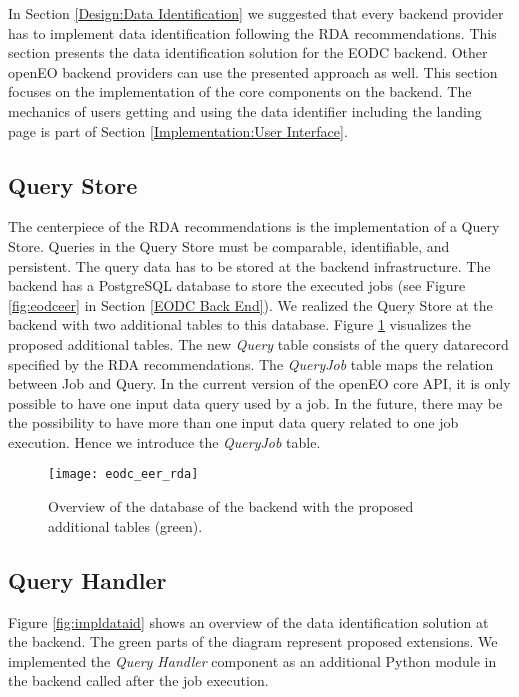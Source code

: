 \documentclass[draft,final]{vutinfth} %
\begin{document}
In Section \ref{Design:Data Identification} we suggested that every backend provider has to implement data identification following the RDA recommendations. This section presents the data identification solution for the EODC backend. Other openEO backend providers can use the presented approach as well. This section focuses on the implementation of the core components on the backend. The mechanics of users getting and using the data identifier including the landing page is part of Section \ref{Implementation:User Interface}. \\

\subsection{Query Store}
The centerpiece of the RDA recommendations is the implementation of a Query Store. Queries in the Query Store must be comparable, identifiable, and persistent. The query data has to be stored at the backend infrastructure. The backend has a PostgreSQL database to store the executed jobs (see Figure \ref{fig:eodceer} in Section \ref{EODC Back End}). We realized the Query Store at the backend with two additional tables to this database. Figure \ref{fig:eer_rda} visualizes the proposed additional tables. The new \textit{Query} table consists of the query datarecord specified by the RDA recommendations. The \textit{QueryJob} table maps the relation between Job and Query. In the current version of the openEO core API, it is only possible to have one input data query used by a job. In the future, there may be the possibility to have more than one input data query related to one job execution. Hence we introduce the \textit{QueryJob} table. 

\begin{figure}[h]
	\centering
	\texttt{[image: eodc\_eer\_rda]}
	\caption{Overview of the database of the backend with the proposed additional tables (green).}
	\label{fig:eer_rda} %
\end{figure}

\subsection{Query Handler}
Figure \ref{fig:impldataid} shows an overview of the data identification solution at the backend. The green parts of the diagram represent proposed extensions. We implemented the \textit{Query Handler} component as an additional Python module in the backend called after the job execution. 
\end{document}
